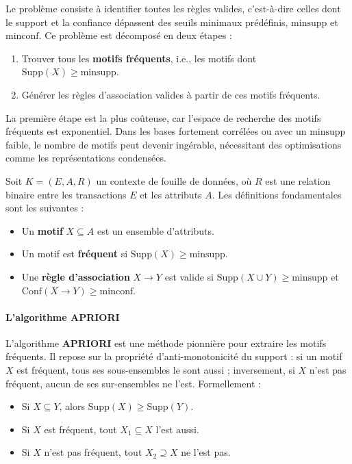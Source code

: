 \documentclass[a4paper,12pt]{article}
\begin{document}
        Le problème consiste à identifier toutes les règles valides, c’est-à-dire celles dont le support et la confiance dépassent des seuils minimaux prédéfinis, \( \text{minsupp} \) et \( \text{minconf} \). Ce problème est décomposé en deux étapes \cite{HGN00} :
        \begin{enumerate}
            \item Trouver tous les \textbf{motifs fréquents}, i.e., les motifs dont \( \text{Supp}(X) \geq \text{minsupp} \).
            \item Générer les règles d’association valides à partir de ces motifs fréquents.
        \end{enumerate}
        
        La première étape est la plus coûteuse, car l’espace de recherche des motifs fréquents est exponentiel. Dans les bases fortement corrélées ou avec un \( \text{minsupp} \) faible, le nombre de motifs peut devenir ingérable, nécessitant des optimisations comme les représentations condensées.
        
        \label{sec:def_principes}
        
        Soit \( K = (E, A, R) \) un contexte de fouille de données, où \( R \) est une relation binaire entre les transactions \( E \) et les attributs \( A \). Les définitions fondamentales sont les suivantes :
        \begin{itemize}
            \item Un \textbf{motif} \( X \subseteq A \) est un ensemble d’attributs.
            \item Un motif est \textbf{fréquent} si \( \text{Supp}(X) \geq \text{minsupp} \).
            \item Une \textbf{règle d’association} \( X \rightarrow Y \) est valide si \( \text{Supp}(X \cup Y) \geq \text{minsupp} \) et \( \text{Conf}(X \rightarrow Y) \geq \text{minconf} \).
        \end{itemize}
        
        \paragraph{L’algorithme APRIORI}
        
        L’algorithme \textbf{APRIORI} \cite{AS94} est une méthode pionnière pour extraire les motifs fréquents. Il repose sur la propriété d’anti-monotonicité du support : si un motif \( X \) est fréquent, tous ses sous-ensembles le sont aussi ; inversement, si \( X \) n’est pas fréquent, aucun de ses sur-ensembles ne l’est. Formellement :
        \begin{itemize}
            \item Si \( X \subseteq Y \), alors \( \text{Supp}(X) \geq \text{Supp}(Y) \).
            \item Si \( X \) est fréquent, tout \( X_1 \subseteq X \) l’est aussi.
            \item Si \( X \) n’est pas fréquent, tout \( X_2 \supseteq X \) ne l’est pas.
        \end{itemize}
        
\end{document}
